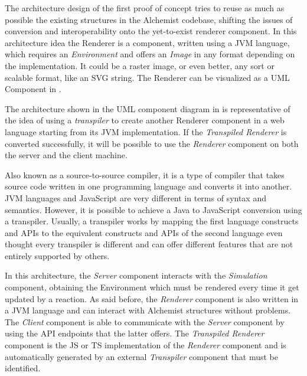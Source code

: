 The architecture design of the first proof of concept tries to reuse as much as possible the existing structures in the Alchemist codebase, shifting the issues of conversion and interoperability  onto the yet-to-exist renderer component. In this architecture idea the Renderer is a component, written using a JVM language, which requires an \textit{Environment} and offers an \textit{Image} in any format depending on the implementation. It could be a raster image, or even better, any sort or scalable format, like an SVG string. The Renderer can be visualized as a UML Component in .


The architecture shown in the UML component diagram in  is representative of the idea of using a \textit{transpiler} to create another Renderer component in a web language starting from its JVM implementation. If the \textit{Transpiled Renderer} is converted successfully, it will be possible to use the \textit{Renderer} component on both the server and the client machine.

\begin{info}[Transpiler:]
	Also known as a source-to-source compiler, it is a type of compiler that takes source code written in one programming language and converts it into another. JVM languages and JavaScript are very different in terms of syntax and semantics. However, it is possible to achieve a Java to JavaScript conversion using a transpiler.
	Usually, a transpiler works by mapping the first language constructs and APIs to the equivalent constructs and APIs of the second language even thought every transpiler is different and can offer different features that are not entirely supported by others.
\end{info}


In this architecture, the \textit{Server} component interacts with the \textit{Simulation} component, obtaining the Environment which must be rendered every time it get updated by a reaction. As said before, the \textit{Renderer} component is also written in a JVM language and can interact with Alchemist structures without problems. The \textit{Client} component is able to communicate with the \textit{Server} component by using the API endpoints that the latter offers. The \textit{Transpiled Renderer} component is the JS or TS implementation of the \textit{Renderer} component and is automatically generated by an external \textit{Transpiler} component that must be identified.\newline

